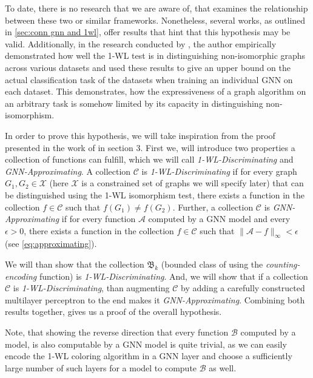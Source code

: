 \documentclass[11pt, dvipsnames, DIV=12]{scrreprt}
\theoremstyle{definition}
\newcommand{\wlnn}{\text{1-WL+NN }}
\begin{document}
To date, there is no research that we are aware of, that examines the relationship between these two
or similar frameworks. Nonetheless, several works, as outlined in \autoref{sec:conn gnn and 1wl}, offer results that hint that this hypothesis may be valid.  Additionally, in the research conducted by \cite{Zopf2022}, the author empirically demonstrated how well the 1-WL test is in distinguishing non-isomorphic graphs across various datasets and used these results to give an upper bound on the actual classification task of the datasets when training an individual GNN on each dataset. This demonstrates, how the expressiveness of a graph algorithm on an arbitrary task is somehow limited by its capacity in distinguishing non-isomorphism.

In order to prove this hypothesis, we will take inspiration from the proof presented in the work of \cite{Chen2019} in section 3. First we, will introduce two properties a collection of functions can fulfill, which we will call \textit{1-WL-Discriminating} and \textit{GNN-Approximating}. A collection $\mathcal{C}$ is \textit{1-WL-Discriminating} if for every graph $G_1, G_2 \in \mathcal{X}$ (here $\mathcal{X}$ is a constrained set of graphs we will specify later) that can be distinguished using the 1-WL isomorphism test, there exists a function in the collection $f \in \mathcal{C}$ such that $f(G_1) \neq f(G_2)$. Further, a collection $\mathcal{C}$ is \textit{GNN-Approximating} if for every function $\mathcal{A}$ computed by a GNN model and every $\epsilon > 0$, there exists a function in the collection $f \in \mathcal{C}$ such that $\| \mathcal{A} - f \|_\infty < \epsilon$ (see \autoref{eq:approximating}).

We will than show that the collection $\mathfrak{B}_k$ (bounded class of \wlnn using the \emph{counting-encoding} function) is \textit{1-WL-Discriminating}. And, we will show that if a collection $\mathcal{C}$ is \textit{1-WL-Discriminating}, than augmenting $\mathcal{C}$ by adding a carefully constructed multilayer perceptron to the end makes it \textit{GNN-Approximating}. Combining both results together, gives us a proof of the overall hypothesis.

Note, that showing the reverse direction that every function $\mathcal{B}$ computed by a \wlnn model, is also computable by a GNN model is quite trivial, as we can easily encode the 1-WL coloring algorithm in a GNN layer and choose a sufficiently large number of such layers for a model to compute $\mathcal{B}$ as well.
\end{document}
